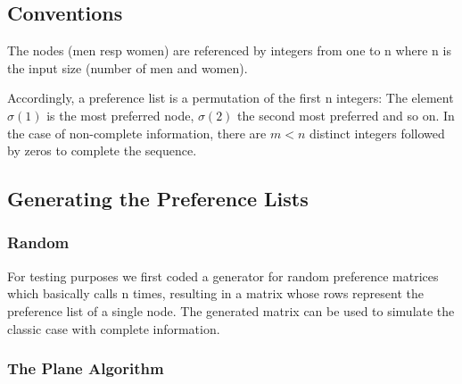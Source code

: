 \documentclass[11pt]{article}
\begin{document}
\subsection{Conventions}

The nodes (men resp women) are referenced by integers from one to n where n is the input
size (number of men and women).

Accordingly, a preference list is a permutation of the first n integers: The element $\sigma(1)$ 
is the most preferred node, $\sigma(2)$ the second most preferred and so on. In the case of 
non-complete information, there are $m<n$ distinct integers followed by zeros to complete the 
sequence.

\subsection{Generating the Preference Lists}

\subsubsection{Random}

For testing purposes we first coded a generator for random preference matrices which 
basically calls  n times, resulting in a matrix whose rows represent the 
preference list of a single node. The generated matrix can be used to simulate the classic 
case with complete information.

\subsubsection{The Plane Algorithm}
\end{document}
